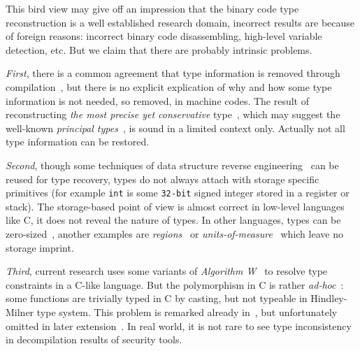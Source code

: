 \documentclass[a4paper]{llncs}
\begin{document}
This bird view may give off an impression that the
binary code type reconstruction is a well established research domain, incorrect results
are because of foreign reasons: incorrect binary code disassembling,
high-level variable detection, etc. But we claim that there are probably intrinsic problems.

\emph{First}, there is a common agreement that type information is removed through
compilation~\cite{lee_tie_2011,caballero_type_2016,lin_automatic_2010},
but there is no explicit explication of why and how some type information is not needed,
so removed, in machine codes. The result of reconstructing \emph{the most precise yet conservative}
type~\cite{lee_tie_2011}, which may suggest the well-known
\emph{principal types}~\cite{damas_principal_1982,hindley_principal_1969},
is sound in a limited context only. Actually not all type
information can be restored.

\emph{Second}, though some techniques of data structure reverse
engineering~\cite{caballero_type_2016, caballero_polyglot_2007} can be reused for
type recovery, types do not always attach with storage specific primitives (for example
\texttt{int} is some \texttt{32-bit} signed integer stored in a register or stack).
The storage-based point of view is almost correct in low-level languages like C, it
does not reveal the nature of types. In other languages, types can be
zero-sized~\cite{noauthor_phantom_nodate}, another examples are
\emph{regions}~\cite{grossman_region-based_2002} or \emph{units-of-measure}~\cite{kennedy_types_2010}
which leave no storage imprint.

\emph{Third}, current research uses some variants of
\emph{Algorithm W}~\cite{milner_theory_1978,cardelli_basic_1987} to resolve type
constraints in a C-like language. But the polymorphism in C is rather
\emph{ad-hoc}~\cite{strachey_fundamental_2000}: some functions are
trivially typed in C by casting, but not typeable in Hindley-Milner type system. This
problem is remarked already in~\cite{mycroft_type-based_1999}, but unfortunately omitted in
later extension~\cite{lee_tie_2011}. In real world, it is not rare to see type inconsistency in decompilation results
of security tools.

\end{document}
